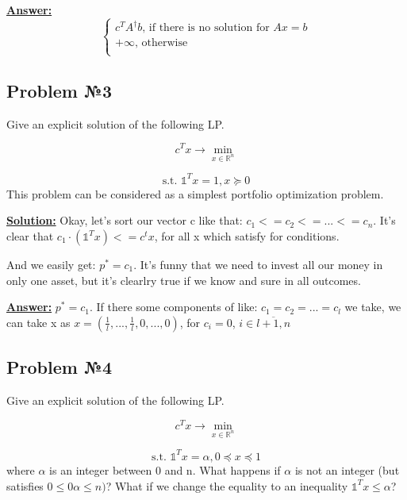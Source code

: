 \underline{\textbf{Answer:}}
\begin{equation*}
    \begin{cases}
    c^TA^{\dag}b \text{, if there is no solution for } Ax = b \\
    + \infty \text{, otherwise} \\
    \end{cases}
\end{equation*}


\subsection{Problem №3}
Give an explicit solution of the following LP.

\begin{equation*}
    c^T x  \xrightarrow{} \min\limits_{x \in \mathds{R}^n}
\end{equation*}

\begin{equation*}
   \text{s.t. } \mathds{1}^Tx = 1, x \succeq 0
\end{equation*}
This problem can be considered as a simplest portfolio optimization problem.

\underline{\textbf{Solution:}}
Okay, let's sort our vector c like that: $c_1 <= c_2 <= ... <= c_n$. It's clear that $c_1 \cdot (\mathds{1}^Tx) <= c^tx$, for all x which satisfy for conditions. 

And we easily get: $p^* = c_1$. It's funny that we need to invest all our money in only one asset, but it's clearlry true if we know and sure in all outcomes.

\underline{\textbf{Answer:}} $p^* = c_1$. If there some components of like: $c_1 = c_2 = ... = c_l$ we take, we can take x as $x = (\frac{1}{l}, ..., \frac{1}{l}, 0, ..., 0)$, for $c_i = 0$, $i \in \overline{l+1, n}$

\subsection{Problem №4}
Give an explicit solution of the following LP.

\begin{equation*}
    c^T x  \xrightarrow{} \min\limits_{x \in \mathds{R}^n}
\end{equation*}

\begin{equation*}
   \text{s.t. } \mathds{1}^Tx = \alpha, 0 \preccurlyeq x \preccurlyeq 1
\end{equation*}
where $\alpha$ is an integer between 0 and n. What happens if $\alpha$ is not an integer (but satisfies $0 \leq 0 \alpha \leq n)$? What if we change the equality to an inequality $\mathds{1}^Tx \leq \alpha$?

